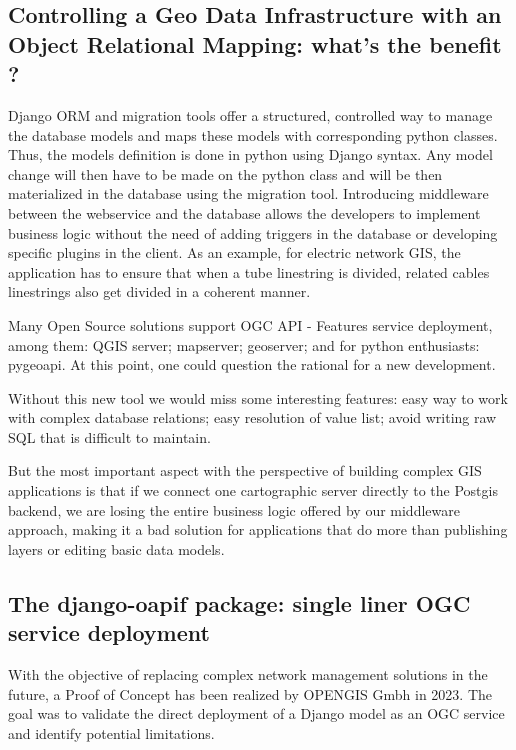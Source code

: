 \documentclass[runningheads]{llncs}
\begin{document}
\subsection{Controlling a Geo Data Infrastructure with an Object Relational Mapping: what’s the benefit ?}

 Django ORM and migration tools offer a structured, controlled way to manage the database models and maps these models with corresponding python classes. Thus, the models definition is done in python using Django syntax. Any model change will then have to be made on the python class and will be then materialized in the database using the migration tool. Introducing middleware between the webservice and the database allows the developers to implement business logic without the need of adding triggers in the database or developing specific plugins in the client. As an example, for electric network GIS, the application has to ensure that when a tube linestring is divided, related cables linestrings also get divided in a coherent manner.

Many Open Source solutions support OGC API - Features service deployment, among them: QGIS server; mapserver; geoserver; and for python enthusiasts: pygeoapi. At this point, one could question the rational for a new development. 

Without this new tool we would miss some interesting features: easy way to work with complex database relations; easy resolution of value list; avoid writing raw SQL that is difficult to maintain.

But the most important aspect with the perspective of building complex GIS applications is that if we connect one cartographic server directly to the Postgis backend, we are losing the entire business logic offered by our middleware approach, making it a bad solution for applications that do more than publishing layers or editing basic data models.
 

\subsection{The django-oapif package: single liner OGC service deployment}

With the objective of replacing complex network management solutions in the future, a Proof of Concept\cite{ref_article6}\cite{ref_article7} has been realized by OPENGIS Gmbh in 2023. The goal was to validate the direct deployment of a Django model as an OGC service and identify potential limitations.
\end{document}
